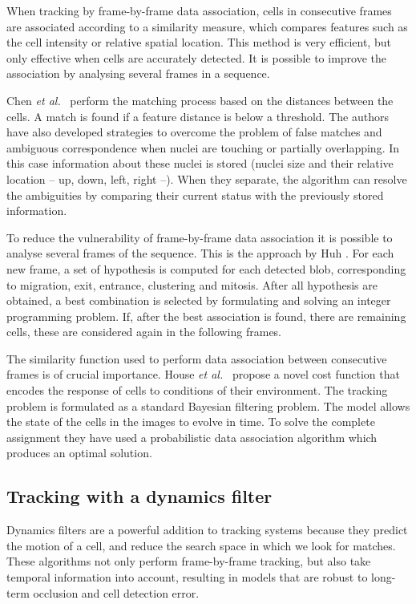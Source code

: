 When tracking by frame-by-frame data association, cells in consecutive frames are associated according to a similarity measure, which compares features such as the cell intensity or relative spatial location. This method is very efficient, but only effective when cells are accurately detected. It is possible to improve the association by analysing several frames in a sequence.

Chen \emph{et al.}~\cite{chen06} perform the matching process based on the distances between the cells. A match is found if a feature distance is below a threshold. The authors have also developed strategies to overcome the problem of false matches and ambiguous correspondence when nuclei are touching or partially overlapping. In this case information about these nuclei is stored (nuclei size and their relative location -- up, down, left, right --). When they separate, the algorithm can resolve the ambiguities by comparing their current status with the previously stored information.

To reduce the vulnerability of frame-by-frame data association it is possible to analyse several frames of the sequence. This is the approach by Huh \cite{huh13}. For each new frame, a set of hypothesis is computed for each detected blob, corresponding to migration, exit, entrance, clustering and mitosis. After all hypothesis are obtained, a best combination is selected by formulating and solving an integer programming problem. If, after the best association is found, there are remaining cells, these are considered again in the following frames.

The similarity function used to perform data association between consecutive frames is of crucial importance. House \emph{et al.}~\cite{house09} propose a novel cost function that encodes the response of cells to conditions of their environment. The tracking problem is formulated as a standard Bayesian filtering problem. The model allows the state of the cells in the images to evolve in time. To solve the complete assignment they have used a probabilistic data association algorithm which produces an optimal solution.

\subsection{Tracking with a dynamics filter \statusfirstdraft}
Dynamics filters are a powerful addition to tracking systems because they predict the motion of a cell, and reduce the search space in which we look for matches. These algorithms not only perform frame-by-frame tracking, but also take temporal information into account, resulting in models that are robust to long-term occlusion and cell detection error.

